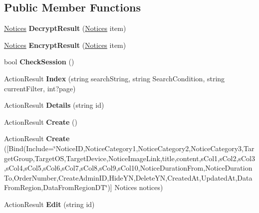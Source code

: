 \subsection*{Public Member Functions}
\begin{DoxyCompactItemize}
\item 
\hyperlink{a00168}{Notices} {\bfseries Decrypt\+Result} (\hyperlink{a00168}{Notices} item)\hypertarget{a00169_a29973b1ebd8717572f53a22553e4f9f7}{}\label{a00169_a29973b1ebd8717572f53a22553e4f9f7}

\item 
\hyperlink{a00168}{Notices} {\bfseries Encrypt\+Result} (\hyperlink{a00168}{Notices} item)\hypertarget{a00169_ad9878204be29e2d79a477e00bcb47b94}{}\label{a00169_ad9878204be29e2d79a477e00bcb47b94}

\item 
bool {\bfseries Check\+Session} ()\hypertarget{a00169_a829abaa9f9035347d7b8129723c8c883}{}\label{a00169_a829abaa9f9035347d7b8129723c8c883}

\item 
Action\+Result {\bfseries Index} (string search\+String, string Search\+Condition, string current\+Filter, int?page)\hypertarget{a00169_a264bba593edb15c30004d90159209440}{}\label{a00169_a264bba593edb15c30004d90159209440}

\item 
Action\+Result {\bfseries Details} (string id)\hypertarget{a00169_a54f10c1b319ee8947f41103b2ba43541}{}\label{a00169_a54f10c1b319ee8947f41103b2ba43541}

\item 
Action\+Result {\bfseries Create} ()\hypertarget{a00169_ad8e2f8a6f4b9701a901b1d8dd466535b}{}\label{a00169_ad8e2f8a6f4b9701a901b1d8dd466535b}

\item 
Action\+Result {\bfseries Create} (\mbox{[}Bind(Include=\char`\"{}Notice\+ID,Notice\+Category1,Notice\+Category2,Notice\+Category3,Target\+Group,Target\+OS,Target\+Device,Notice\+Image\+Link,title,content,s\+Col1,s\+Col2,s\+Col3,s\+Col4,s\+Col5,s\+Col6,s\+Col7,s\+Col8,s\+Col9,s\+Col10,Notice\+Duration\+From,Notice\+Duration\+To,Order\+Number,Create\+Admin\+ID,Hide\+YN,Delete\+YN,Created\+At,Updated\+At,Data\+From\+Region,Data\+From\+Region\+DT\char`\"{})\mbox{]} Notices notices)\hypertarget{a00169_a8da7620948c17876ea9b3f4950621878}{}\label{a00169_a8da7620948c17876ea9b3f4950621878}

\item 
Action\+Result {\bfseries Edit} (string id)\hypertarget{a00169_afa610ec3d13c73a22942a64fa9a51401}{}\label{a00169_afa610ec3d13c73a22942a64fa9a51401}


\end{DoxyCompactItemize}
